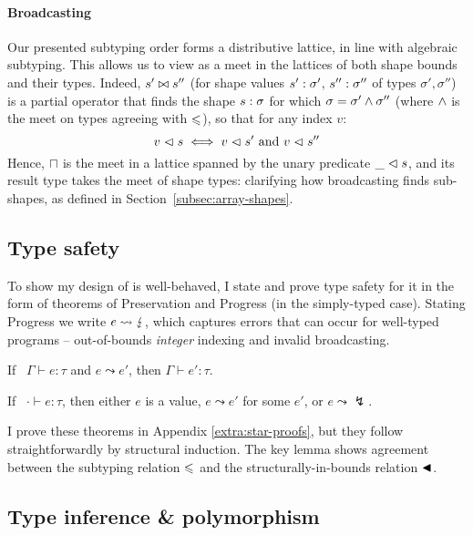 \paragraph{Broadcasting}
Our presented subtyping order forms a distributive lattice, in line with algebraic subtyping. 
This allows us to view as a meet in the lattices of both shape bounds and their types. 
Indeed, $s' \bowtie s''$ (for shape values $s': \sigma'$, $s'' : \sigma''$ of types $\sigma', \sigma''$) is a partial operator that finds the shape $s : \sigma$ for which $\sigma = \sigma' \land \sigma''$ (where $\land$ is the meet on types agreeing with $\leqslant$), so that for any index $v$: 
$$ v \vartriangleleft s \iff v \vartriangleleft s' \text{ and } v \vartriangleleft s'' $$
Hence, $\sqcap$ is the meet in a lattice spanned by the unary predicate $\_ \vartriangleleft s$, and its result type takes the meet of shape types: clarifying how broadcasting finds sub-shapes, as defined in Section~\ref{subsec:array-shapes}.

\subsection{Type safety}
\label{subsec:type-safety}

To show my design of \starr{} is well-behaved, I state and prove type safety for it in the form of theorems of Preservation and Progress (in the simply-typed case). Stating Progress we write $e \leadsto \lightning$, which captures errors that can occur for well-typed programs -- out-of-bounds \emph{integer} indexing and invalid broadcasting.

\begin{theorem}[Preservation]
    If \ $\Gamma \vdash e : \tau$ and $e \leadsto e'$, then $\Gamma \vdash e' : \tau$.
\end{theorem}
\begin{theorem}[Progress]
    If \ $\cdot \vdash e : \tau$, then either $e$ is a value, $e \leadsto e'$ for some $e'$, or $e \leadsto \lightning$.
\end{theorem}

I prove these theorems in Appendix \ref{extra:star-proofs}, but they follow straightforwardly by structural induction. The key lemma shows agreement between the subtyping relation $\leqslant$ and the structurally-in-bounds relation $\blacktriangleleft$.

\needspace{4em}
\subsection{Type inference \& polymorphism}
\label{subsec:type-inference}

